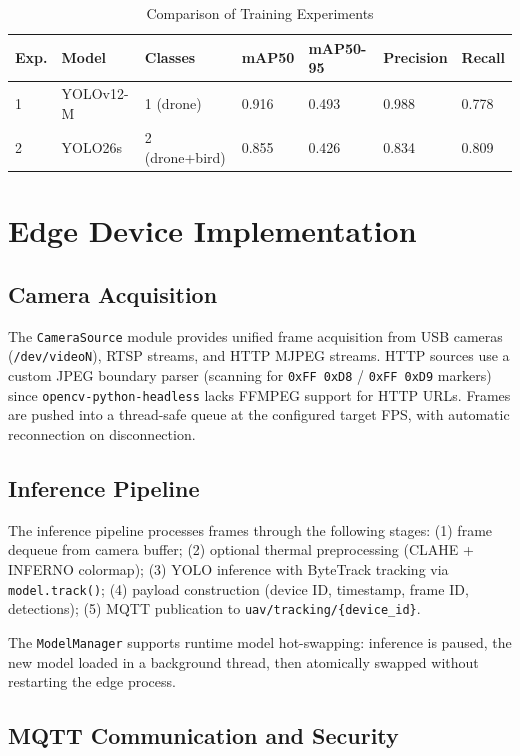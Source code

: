 \documentclass[12pt,a4paper]{report}
\begin{document}
\begin{table}[H]
\centering
\caption{Comparison of Training Experiments}
\begin{tabular}{@{}lllllll@{}}
\toprule
\textbf{Exp.} & \textbf{Model} & \textbf{Classes} & \textbf{mAP50} & \textbf{mAP50-95} & \textbf{Precision} & \textbf{Recall} \\
\midrule
1 & YOLOv12-M & 1 (drone) & 0.916 & 0.493 & 0.988 & 0.778 \\
2 & YOLO26s & 2 (drone+bird) & 0.855 & 0.426 & 0.834 & 0.809 \\
\bottomrule
\end{tabular}
\end{table}

\section{Edge Device Implementation}

\subsection{Camera Acquisition}

The \texttt{CameraSource} module provides unified frame acquisition from USB
cameras (\texttt{/dev/videoN}), RTSP streams, and HTTP MJPEG streams. HTTP
sources use a custom JPEG boundary parser (scanning for \texttt{0xFF 0xD8} /
\texttt{0xFF 0xD9} markers) since \texttt{opencv-python-headless} lacks FFMPEG
support for HTTP URLs. Frames are pushed into a thread-safe queue at the
configured target FPS, with automatic reconnection on disconnection.

\subsection{Inference Pipeline}

The inference pipeline processes frames through the following stages:
(1) frame dequeue from camera buffer;
(2) optional thermal preprocessing (CLAHE + INFERNO colormap);
(3) YOLO inference with ByteTrack tracking via \texttt{model.track()};
(4) payload construction (device ID, timestamp, frame ID, detections);
(5) MQTT publication to \texttt{uav/tracking/\{device\_id\}}.

The \texttt{ModelManager} supports runtime model hot-swapping: inference is
paused, the new model loaded in a background thread, then atomically swapped
without restarting the edge process.

\subsection{MQTT Communication and Security}
\end{document}
